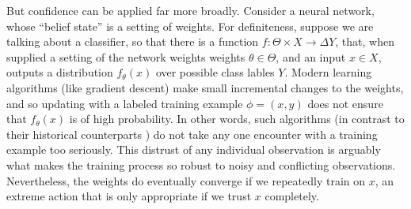 

But confidence can be applied far more broadly.
Consider a neural network, whose ``belief state'' is a setting of weights.
For definiteness, suppose we are talking about a classifier, so that there is a function $f : \Theta \times X \to \Delta Y$, that, when supplied a setting of the network weights weights $\theta \in \Theta$, and an input $x \in X$, outputs a distribution $f_\theta(x)$ over possible class lables $Y$. 
Modern learning algorithms (like gradient descent) make small incremental changes to the weights, and so updating with a labeled training example $\phi = (x,y)$ does not ensure that $f_\theta(x)$ is of high probability. 
In other words, such algorithms 
(in contrast to their historical counterparts \parencite{conjunctions}) 
do not take any one encounter with a training example too seriously.
This distrust of any individual observation is arguably what makes the training process so robust to noisy and conflicting observations.
Nevertheless, the weights do eventually converge if we repeatedly train on $x$, 
an extreme action that is only appropriate if we trust $x$ completely.
